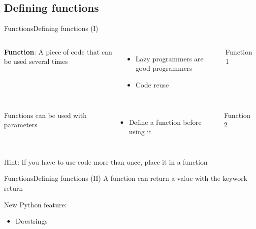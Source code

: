 \documentclass[10pt,compress]{beamer} %
\begin{document}
\subsection{Defining functions}
\begin{frame}{Functions}{Defining functions (I)}
    \begin{columns}
	\textbf{Function}: A piece of code that can be used several times
		\begin{itemize}
		\item Lazy programmers are good programmers
		\item Code reuse
		\end{itemize}
		\begin{exampleblock}{Function 1}
		\vspace{-0.2cm}
		
		\vspace{-0.2cm}
		\end{exampleblock}
	\end{columns}

    \begin{columns}
	Functions can be used with parameters
		\begin{itemize}
		\item Define a function before using it
		\end{itemize}

		\begin{exampleblock}{Function 2}
		\vspace{-0.2cm}
		
		\vspace{-0.2cm}
		\end{exampleblock}
	\end{columns}
	\bigskip
	\centering \alert{Hint: If you have to use code more than once, place it in a function}
\end{frame}


\begin{frame}{Functions}{Defining functions (II)}
    A function can return a value with the keywork \alert{return}
	\begin{exampleblock}{}
	\vspace{-0.2cm}
	
	\vspace{-0.2cm}
	\end{exampleblock}
    New Python feature:
    \begin{itemize}
        \item Docstrings
    \end{itemize}
\end{frame}
\end{document}
